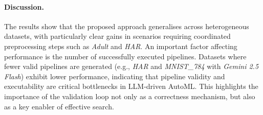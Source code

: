 \documentclass[runningheads]{llncs}
\begin{document}

\paragraph{Discussion.}

The results show that the proposed approach generalises across heterogeneous datasets, with particularly clear gains in scenarios requiring coordinated preprocessing steps such as \textit{Adult} and \textit{\acs{HAR}}.
%
% 
An important factor affecting performance is the number of successfully executed pipelines.
%
Datasets where fewer valid pipelines are generated
(e.g., \textit{\acs{HAR}} and \textit{MNIST\_784} with \textit{Gemini 2.5 Flash})
exhibit lower performance,
indicating that pipeline validity and executability are critical bottlenecks in \ac{LLM}-driven \ac{AutoML}.
%
This highlights the importance of the validation loop not only as a correctness mechanism,
but also as a key enabler of effective search.



\end{document}
